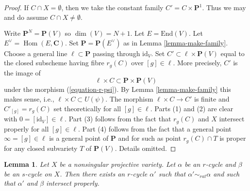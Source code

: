 \documentclass{stacks-project}
\theoremstyle{plain}
\newtheorem{lemma}[subsection]{Lemma}
\theoremstyle{definition}
\theoremstyle{remark}
\numberwithin{equation}{subsection}
\def\Hom{\mathop{\mathrm{Hom}}\nolimits}
\begin{document}
\begin{proof}
If $C \cap X = \emptyset$, then we take the constant family
$C' = C \times \mathbf{P}^1$. Thus we may and do assume
$C \cap X \not = \emptyset$.

\medskip\noindent
Write $\mathbf{P}^N = \mathbf{P}(V)$ so $\dim(V) = N + 1$. Let
$E = \text{End}(V)$. Let $E^\vee = \Hom(E, \mathbf{C})$. Set
$\mathbf{P} = \mathbf{P}(E^\vee)$ as in Lemma \ref{lemma-make-family}.
Choose a general line $\ell \subset \mathbf{P}$ passing through $\text{id}_V$.
Set $C' \subset \ell \times \mathbf{P}(V)$ equal to the
closed subscheme having fibre $r_g(C)$ over $[g] \in \ell$.
More precisely, $C'$ is the image of
$$
\ell \times C \subset \mathbf{P} \times \mathbf{P}(V)
$$
under the morphism (\ref{equation-r-psi}). By Lemma \ref{lemma-make-family}
this makes sense, i.e., $\ell \times C \subset U(\psi)$. The morphism
$\ell \times C \to C'$ is finite and $C'_{[g]} = r_g(C)$ set theoretically
for all $[g] \in \ell$. Parts (1) and (2) are clear with
$0 = [\text{id}_V] \in \ell$. Part (3) follows from the fact
that $r_g(C)$ and $X$ intersect properly for all $[g] \in \ell$.
Part (4) follows from the fact that a general point $\infty = [g] \in \ell$
is a general point of $\mathbf{P}$ and for such as point
$r_g(C) \cap T$ is proper for any closed subvariety $T$ of $\mathbf{P}(V)$.
Details omitted.
\end{proof}

\begin{lemma}
\label{lemma-moving-move}
Let $X$ be a nonsingular projective variety. Let $\alpha$ be an
$r$-cycle and $\beta$ be an $s$-cycle on $X$. Then there exists
an $r$-cycle $\alpha'$ such that $\alpha' \sim_{rat} \alpha$ and
such that $\alpha'$ and $\beta$ intersect properly.
\end{lemma}
\end{document}
